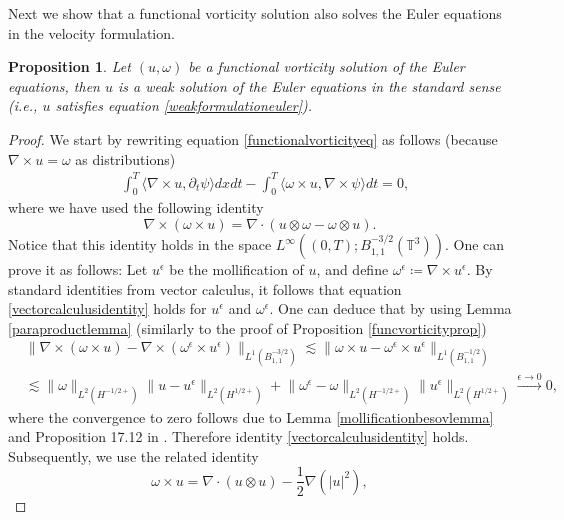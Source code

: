 \documentclass[12pt,a4paper]{article}
\newtheorem{proposition}[theorem]{Proposition}
\theoremstyle{definition}
\theoremstyle{remark}
\numberwithin{equation}{section}
\begin{document}
Next we show that a functional vorticity solution also solves the Euler equations in the velocity formulation. 
\begin{proposition}
Let $(u, \omega)$ be a functional vorticity solution of the Euler equations, then $u$ is a weak solution of the Euler equations in the standard sense (i.e., $u$ satisfies equation \eqref{weakformulationeuler}).
\end{proposition}
\begin{proof}
We start by rewriting equation \eqref{functionalvorticityeq} as follows (because $\nabla \times u = \omega$ as distributions)
\begin{align} \label{curlformvorticityeq}
&\int_0^T \langle \nabla \times u, \partial_t \psi \rangle dx dt - \int_0^T \big\langle \omega \times u , \nabla \times \psi \big\rangle dt = 0,
\end{align}
where we have used the following identity
\begin{equation} \label{vectorcalculusidentity}
\nabla \times ( \omega \times u ) = \nabla \cdot (u \otimes \omega - \omega \otimes u).
\end{equation}
Notice that this identity holds in the space $L^\infty ((0,T); B^{-3/2}_{1,1} (\mathbb{T}^3))$. One can prove it as follows: Let $u^\epsilon$ be the mollification of $u$, and define $\omega^\epsilon \coloneqq \nabla \times u^\epsilon$. By standard identities from vector calculus, it follows that equation \eqref{vectorcalculusidentity} holds for $u^\epsilon$ and $\omega^\epsilon$. One can deduce that by using Lemma \ref{paraproductlemma} (similarly to the proof of Proposition \ref{funcvorticityprop})
\begin{align*}
&\lVert \nabla \times ( \omega \times u ) - \nabla \times ( \omega^\epsilon \times u^\epsilon ) \rVert_{L^1 (B^{-3/2}_{1,1})} \lesssim \lVert \omega \times u - \omega^\epsilon \times u^\epsilon \rVert_{L^1 (B^{-1/2}_{1,1})} \\
&\lesssim \lVert \omega \rVert_{L^2 (H^{-1/2+})} \lVert u - u^\epsilon \rVert_{L^2 (H^{1/2+})} + \lVert \omega^\epsilon - \omega \rVert_{L^2 (H^{-1/2+})} \lVert u^\epsilon \rVert_{L^2 (H^{1/2+})} \xrightarrow[]{\epsilon \rightarrow 0} 0,
\end{align*}
where the convergence to zero follows due to Lemma \ref{mollificationbesovlemma} and Proposition 17.12 in \cite{leoni}. Therefore identity \eqref{vectorcalculusidentity} holds. Subsequently, we use the related identity
\begin{equation} \label{vectorcalculusidentity2}
\omega \times u = \nabla \cdot (u \otimes u) - \frac{1}{2} \nabla (\lvert u \rvert^2),

\end{equation}
\end{proof}
\end{document}
